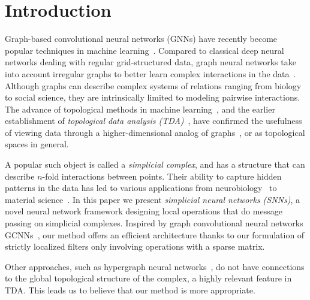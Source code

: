 \section{Introduction}



Graph-based convolutional neural networks (GNNs) have recently become popular techniques in machine learning~\cite{defferrard2016convolutional, bronstein2017geometric, wu2020survey}. Compared to classical deep neural networks dealing with regular grid-structured data, graph neural networks take into account irregular graphs to better learn complex interactions in the data~\cite{battaglia2018relational}. Although graphs can describe complex systems of relations ranging from biology to social science, they are intrinsically limited to modeling pairwise interactions. The advance of topological methods in machine learning~\cite{Gabrielsson2020topological, Hofer2019LearningRO, rieck2018neural}, and the earlier establishment of \emph{topological data analysis (TDA)}~\cite{carlsson2008,chazal2017,edelsbrunner2010computational,ghrist2008barcodes}, have confirmed the usefulness of viewing data through a higher-dimensional analog of graphs~\cite{moore2012,patania2017}, or as topological spaces in general. 

A popular such object is called a \emph{simplicial complex}, and has a structure that can describe $n$-fold interactions between points. Their ability to capture hidden patterns in the data has led to various applications from neurobiology~\cite{giusti2015,reimann2017} to material science~\cite{hiraoka2016}. In this paper we present \textit{simplicial neural networks (SNNs)}, a novel neural network framework designing local operations that do message passing on simplicial complexes.
Inspired by graph convolutional neural networks GCNNs~\cite{defferrard2016convolutional}, our method offers an efficient architecture thanks to our formulation of strictly localized filters only involving operations with a sparse matrix.

Other approaches, such as hypergraph neural networks~\cite{feng2018hypergraphs}, do not have connections to the global topological structure of the complex, a highly relevant feature in TDA. This leads us to believe that our method is more appropriate.

